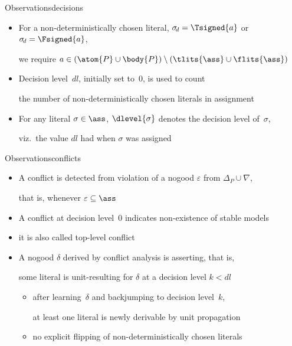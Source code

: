 \begin{frame}[shrink=20]%

\end{frame}
\begin{frame}{Observations}{decisions}
  \bigskip
  \begin{itemize}
  \item For a non-deterministically chosen literal,
    $\sigma_{\!d}=\Tsigned{a}$ or $\sigma_{\!d}=\Fsigned{a}$,
    \par
    we require $a\in(\atom{P}\cup\body{P})\setminus(\tlits{\ass}\cup\flits{\ass})$
    \smallskip
  \item Decision level~$\mathit{dl}$, initially set to~$0$, is used to count
    \par
    the number of non-deterministically chosen literals in assignment~\ass
    \smallskip
  \item For any literal $\sigma\in\ass$,
    $\dlevel{\sigma}$ denotes the decision level of~$\sigma$,
    \par
    viz.\ the value $\mathit{dl}$ had when $\sigma$ was assigned
  \end{itemize}
\end{frame}
\begin{frame}{Observations}{conflicts}
  \bigskip
  \begin{itemize}
  \item A conflict is detected from violation of a nogood $\varepsilon$ from $\Delta_P\cup\nabla$,
    \par
    that is, whenever $\varepsilon\subseteq\ass$
    \smallskip
  \item A conflict at decision level~$0$%
    indicates non-existence of stable models
  \item[] it is also called top-level conflict
    \bigskip
  \item<4-> A nogood $\delta$ derived by conflict analysis is
    \alert{asserting}, that is,
    \par
    some literal is unit-resulting for $\delta$ at a decision level $k<\mathit{dl}$
    \begin{itemize}\normalsize
    \item after learning~$\delta$ and backjumping to decision level~$k$,

      at least one literal is newly derivable by unit propagation
      \smallskip
    \item no explicit flipping of non-deterministically chosen literals
    \end{itemize}
  \end{itemize}
\end{frame}

